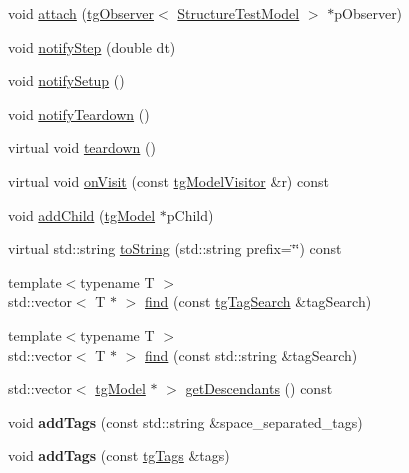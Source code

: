 \begin{DoxyCompactItemize}
\item 
void \hyperlink{classtg_subject_a56ecfd33a048c3a7f1a884318d9af548}{attach} (\hyperlink{classtg_observer}{tg\-Observer}$<$ \hyperlink{class_structure_test_model}{Structure\-Test\-Model} $>$ $\ast$p\-Observer)
\item 
void \hyperlink{classtg_subject_ad9640aa7fcc1e0b4ce8a913a4ce1ea42}{notify\-Step} (double dt)
\item 
void \hyperlink{classtg_subject_a80799e5d0c8512d3d05a55764790392b}{notify\-Setup} ()
\item 
void \hyperlink{classtg_subject_adf7a60dbb0faf0de5528f862e7953e63}{notify\-Teardown} ()
\item 
virtual void \hyperlink{classtg_model_adb5eec1dcf70a8c039850aea144dcc7e}{teardown} ()
\item 
virtual void \hyperlink{classtg_model_aee6457e0fc54d5570b87bfc779f9b1c0}{on\-Visit} (const \hyperlink{classtg_model_visitor}{tg\-Model\-Visitor} \&r) const 
\item 
void \hyperlink{classtg_model_a292c17848b96caee32b2286e44c13f2f}{add\-Child} (\hyperlink{classtg_model}{tg\-Model} $\ast$p\-Child)
\item 
virtual std\-::string \hyperlink{classtg_model_af37b0c1a6d4060bfe0bb9b5038a17725}{to\-String} (std\-::string prefix=\char`\"{}\char`\"{}) const 
\item 
{\footnotesize template$<$typename T $>$ }\\std\-::vector$<$ T $\ast$ $>$ \hyperlink{classtg_model_ab75836fdfbd9200f165c3b28a19630c0}{find} (const \hyperlink{classtg_tag_search}{tg\-Tag\-Search} \&tag\-Search)
\item 
{\footnotesize template$<$typename T $>$ }\\std\-::vector$<$ T $\ast$ $>$ \hyperlink{classtg_model_aa40b5fb32f8941e04d537f4e6c6db35c}{find} (const std\-::string \&tag\-Search)
\item 
std\-::vector$<$ \hyperlink{classtg_model}{tg\-Model} $\ast$ $>$ \hyperlink{classtg_model_a2efa4321fa5c77b4ce23b01f6fd3a1c4}{get\-Descendants} () const 
\item 
\hypertarget{classtg_taggable_af0b8f1729653b0b90d2fecbd51163612}{void {\bfseries add\-Tags} (const std\-::string \&space\-\_\-separated\-\_\-tags)}\label{classtg_taggable_af0b8f1729653b0b90d2fecbd51163612}

\item 
\hypertarget{classtg_taggable_af28e3fe1a7e4eb28772dc006d575dd1f}{void {\bfseries add\-Tags} (const \hyperlink{classtg_tags}{tg\-Tags} \&tags)}\label{classtg_taggable_af28e3fe1a7e4eb28772dc006d575dd1f}


\end{DoxyCompactItemize}
